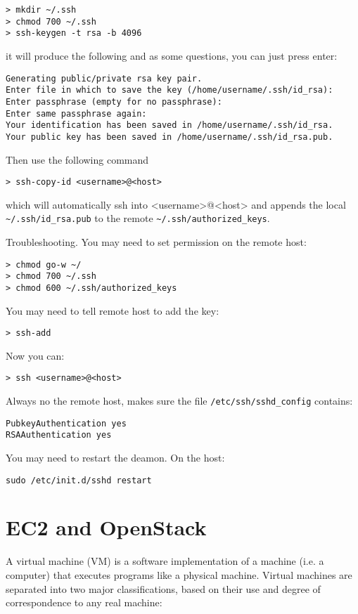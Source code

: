 \documentclass[justified,sixbynine]{tufte-book}
\def\ft{\small\tt}
\theoremstyle{plain}%
\theoremstyle{definition}
\theoremstyle{remark}
\begin{document}
\begin{fullwidth}
\begin{lstlisting}
> mkdir ~/.ssh
> chmod 700 ~/.ssh
> ssh-keygen -t rsa -b 4096
\end{lstlisting}
it will produce the following and as some questions, you can just press enter:
\begin{lstlisting}
Generating public/private rsa key pair.
Enter file in which to save the key (/home/username/.ssh/id_rsa):
Enter passphrase (empty for no passphrase):
Enter same passphrase again:
Your identification has been saved in /home/username/.ssh/id_rsa.
Your public key has been saved in /home/username/.ssh/id_rsa.pub.
\end{lstlisting}
Then use the following command
\begin{lstlisting}
> ssh-copy-id <username>@<host>
\end{lstlisting}
which will automatically ssh into <username>@<host> and appends the local \verb!~/.ssh/id_rsa.pub! to the remote \verb!~/.ssh/authorized_keys!.

Troubleshooting. You may need to set permission on the remote host:
\begin{lstlisting}
> chmod go-w ~/
> chmod 700 ~/.ssh
> chmod 600 ~/.ssh/authorized_keys
\end{lstlisting}

You may need to tell remote host to add the key:
\begin{lstlisting}
> ssh-add
\end{lstlisting}

Now you can:
\begin{lstlisting}
> ssh <username>@<host>
\end{lstlisting}

Always no the remote host, makes sure the file {\ft /etc/ssh/sshd\_config} contains:
\begin{lstlisting}
PubkeyAuthentication yes
RSAAuthentication yes
\end{lstlisting}

You may need to restart the deamon. On the host:
\begin{lstlisting}
sudo /etc/init.d/sshd restart
\end{lstlisting}

\goodbreak\chapter{EC2 and OpenStack}

A virtual machine (VM) is a software implementation of a machine (i.e. a computer) that executes programs like a physical machine. Virtual machines are separated into two major classifications, based on their use and degree of correspondence to any real machine:


\end{fullwidth}
\end{document}
